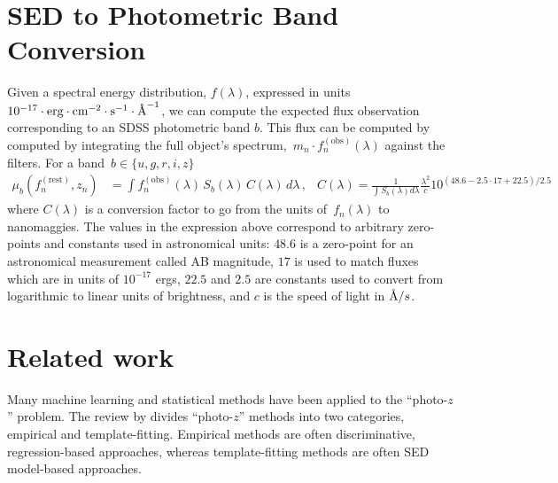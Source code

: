 \documentclass{article} %
\begin{document}
\section{SED to Photometric Band Conversion}
Given a spectral energy distribution, $f(\lambda)$, expressed in units ${10^{-17} \cdot \text{erg} \cdot \text{cm}^{-2} \cdot \text{s}^{-1} \cdot \textup{\AA}^{-1}}$, we can compute the expected flux observation corresponding to an SDSS photometric band $b$.  
This flux can be computed by computed by integrating the full object's spectrum,~${m_n \cdot f_n^{(\text{obs})}(\lambda)}$ against the filters.
For a band~${b \in \{u, g, r, i, z \}}$
\begin{align}
  \mu_b(f_n^{(\text{rest})}, z_n) &= \int f^{(\text{obs})}_n(\lambda) \,S_b(\lambda)\, C(\lambda) \,d \lambda \,,
  & C(\lambda) = \frac{1}{\int S_b(\lambda) d\lambda} \frac{\lambda^2}{c} 10^{(48.6-2.5\cdot 17+22.5)/2.5} \,
\end{align}
where $C(\lambda)$ is a conversion factor to go from the units of~$f_n(\lambda)$ to nanomaggies. The values in the expression above correspond to arbitrary zero-points and constants used in astronomical units: $48.6$ is a zero-point for an astronomical measurement called AB magnitude, $17$ is used to match fluxes which are in units of $10^{-17}$ ergs, $22.5$ and $2.5$ are constants used to convert from logarithmic to linear units of brightness, and $c$ is the speed of light in $\textup{\AA}/s$.  






\section{Related work}
\label{sec:related}
Many machine learning and statistical methods have been applied to the ``photo-$z$'' problem. The review by \cite{walcher2011fitting} divides ``photo-$z$'' methods into two categories, empirical and template-fitting.  Empirical methods are often discriminative, regression-based approaches, whereas template-fitting methods are often SED model-based approaches.  
\end{document}
